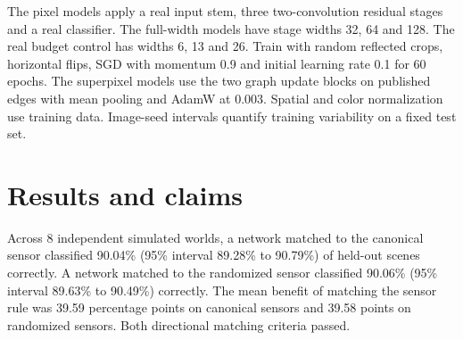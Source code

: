 \documentclass[10pt]{article}
\begin{document}
The pixel models apply a real input stem, three two-convolution residual stages and a real classifier. The full-width models have stage widths 32, 64 and 128. The real budget control has widths 6, 13 and 26. Train with random reflected crops, horizontal flips, SGD with momentum 0.9 and initial learning rate 0.1 for 60 epochs. The superpixel models use the two graph update blocks on published edges with mean pooling and AdamW at 0.003. Spatial and color normalization use training data. Image-seed intervals quantify training variability on a fixed test set.
\section{Results and claims}
Across 8 independent simulated worlds, a network matched to the canonical sensor classified 90.04\% (95\% interval 89.28\% to 90.79\%) of held-out scenes correctly. A network matched to the randomized sensor classified 90.06\% (95\% interval 89.63\% to 90.49\%) correctly. The mean benefit of matching the sensor rule was 39.59 percentage points on canonical sensors and 39.58 points on randomized sensors. Both directional matching criteria passed.
\end{document}
